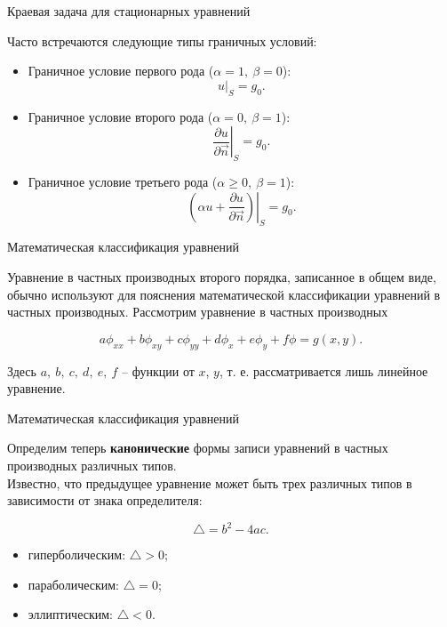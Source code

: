 \documentclass[10pt,xcolor=pst,aspectratio=169]{beamer}
\begin{document}
\begin{frame}{Краевая задача для стационарных уравнений}

	\transdissolve[duration=0.1]
	\justifying
	\large

	Часто встречаются следующие типы граничных условий:

	\begin{itemize}
		\item Граничное условие первого рода ($\alpha = 1, \: \beta = 0$):
			\[
				\left. u \right|_{S} = g_{0}.
			\]

		\item Граничное условие второго рода ($\alpha = 0, \: \beta = 1$):
			\[
				\left. \frac{\partial u}{\partial \vec{n}} \right|_{S} = g_{0}.
			\]

		\item Граничное условие третьего рода ($\alpha \geq 0, \: \beta = 1$):
			\[
				\left. \left( \alpha u + \frac{\partial u}{\partial \vec{n}} \right) \right|_{S} = g_{0}.
			\]
	\end{itemize}

\end{frame}

\begin{frame}{Математическая классификация уравнений}

	\transdissolve[duration=0.1]
	\justifying
	\large

	Уравнение в частных производных второго порядка, записанное в общем виде, обычно используют для пояснения математической классификации уравнений в частных производных. Рассмотрим уравнение в частных производных

	\[
		a \phi_{xx} + b \phi_{xy} + c \phi_{yy} + d \phi_{x} + e \phi_{y} + f \phi = g(x,y).
	\]

	Здесь $a, \: b, \: c, \: d, \: e, \: f$ -- функции от $x$, $y$, т. е. рассматривается лишь линейное уравнение.

\end{frame}

\begin{frame}{Математическая классификация уравнений}

	\transdissolve[duration=0.1]
	\justifying
	\large

	Определим теперь \textbf{канонические} формы записи уравнений в частных производных различных типов.\\

	Известно, что предыдущее уравнение может быть трех различных типов в зависимости от знака определителя:

	\[
		\triangle = b^{2} - 4 a c.
	\]

	\begin{itemize}
		\item гиперболическим: $\triangle > 0$;
		\item параболическим: $\triangle = 0$;
		\item эллиптическим: $\triangle < 0$.
	\end{itemize}

\end{frame}
\end{document}

